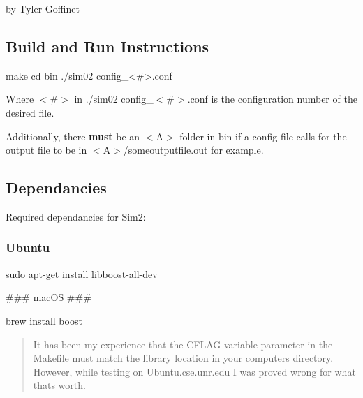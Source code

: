 by Tyler Goffinet

\subsection*{Build and Run Instructions}


\begin{DoxyCode}
make
cd bin
./sim02 config\_<#>.conf
\end{DoxyCode}


Where \textquotesingle{}$<$\#$>$\textquotesingle{} in {\ttfamily ./sim02 config\+\_\+$<$\#$>$.conf} is the configuration number of the desired file.

Additionally, there {\bfseries must} be an {\ttfamily $<$A$>$} folder in {\ttfamily bin} if a config file calls for the output file to be in {\ttfamily $<$A$>$/someoutputfile.out} for example.

\subsection*{Dependancies}

Required dependancies for Sim2\+:

\subsubsection*{Ubuntu}


\begin{DoxyCode}
sudo apt-get install libboost-all-dev
\end{DoxyCode}


\#\#\# mac\+OS \#\#\# 
\begin{DoxyCode}
brew install boost
\end{DoxyCode}


\begin{quote}
It has been my experience that the C\+F\+L\+AG variable parameter in the Makefile must match the library location in your computer\textquotesingle{}s directory. However, while testing on Ubuntu.\+cse.\+unr.\+edu I was proved wrong for what that\textquotesingle{}s worth.\end{quote}
